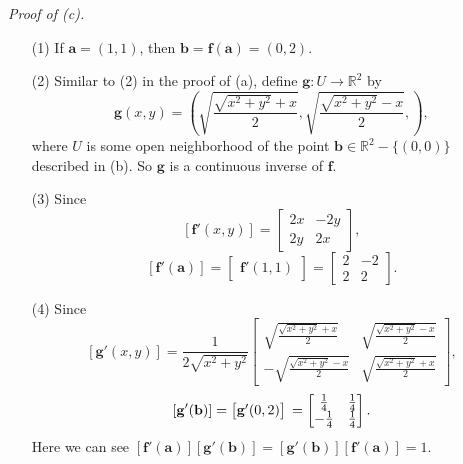 \documentclass{article}
\begin{document}
\emph{Proof of (c).}
\begin{enumerate}
\item[(1)]
  If $\mathbf{a} = \left(1, 1\right)$, then
  $\mathbf{b} = \mathbf{f}(\mathbf{a}) = \left(0,2\right)$.

\item[(2)]
  Similar to (2) in the proof of (a),
  define $\mathbf{g}: U \to \mathbb{R}^2$ by
  \[
    \mathbf{g}(x,y)
    = \left(
      \sqrt{\frac{\sqrt{x^2+y^2}+x}{2}},
      \sqrt{\frac{\sqrt{x^2+y^2}-x}{2}},
    \right),
  \]
  where $U$ is some open neighborhood of the point
  $\mathbf{b} \in \mathbb{R}^2 - \{(0,0)\}$ described in (b).
  So $\mathbf{g}$ is a continuous inverse of $\mathbf{f}$.

\item[(3)]
  Since
  \[
    [\mathbf{f}'(x,y)]
    =
    \begin{bmatrix}
      2x & -2y \\
      2y &  2x
    \end{bmatrix},
  \]
  \[
    [\mathbf{f}'(\mathbf{a})]
    =
    \begin{bmatrix}
      \mathbf{f}'(1, 1)
    \end{bmatrix}
    =
    \begin{bmatrix}
      2 & -2 \\
      2 &  2
    \end{bmatrix}.
  \]

\item[(4)]
  Since
  \[
    [\mathbf{g}'(x,y)]
    =
    \frac{1}{2\sqrt{x^2+y^2}}
    \begin{bmatrix}
      \sqrt{\frac{\sqrt{x^2+y^2}+x}{2}}
        & \sqrt{\frac{\sqrt{x^2+y^2}-x}{2}} \\
      -\sqrt{\frac{\sqrt{x^2+y^2}-x}{2}}
        & \sqrt{\frac{\sqrt{x^2+y^2}+x}{2}}
    \end{bmatrix},
  \]
  \[
    [\mathbf{g}'(\mathbf{b})]
    =
    \begin{bmatrix}
      \mathbf{g}'(0,2)
    \end{bmatrix} \\
    =
    \begin{bmatrix}
       \frac{1}{4} & \frac{1}{4} \\
      -\frac{1}{4} & \frac{1}{4}
    \end{bmatrix}.
  \]
  Here we can see $[\mathbf{f}'(\mathbf{a})][\mathbf{g}'(\mathbf{b})]
  = [\mathbf{g}'(\mathbf{b})][\mathbf{f}'(\mathbf{a})] = 1$.


\end{enumerate}
\end{document}
